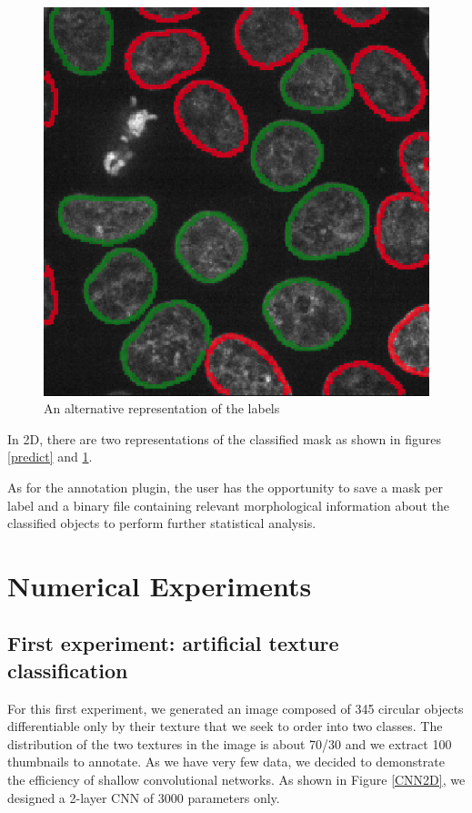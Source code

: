 \documentclass{article}
\begin{document}
\begin{figure}[h!]{}
 \centering
 \includegraphics[scale=0.15]{Figures/resultat_contour.png}
  \caption{An alternative representation of the labels}
  \label{predict_contours}

\end{figure}

In 2D, there are two representations of the classified mask as shown in figures \ref{predict} and \ref{predict_contours}.

As for the annotation plugin, the user has the opportunity to save a mask per label and a binary file containing relevant morphological information about the classified objects to perform further statistical analysis.


\section{Numerical Experiments}
\label{sec:experiments}


\subsection{First experiment: artificial texture classification}

For this first experiment, we generated an image composed of  345 circular objects differentiable only by their texture that we seek to order into two classes. The distribution of the two textures in the image is about 70/30 and we extract 100 thumbnails to annotate. 
As we have very few data, we decided to demonstrate the efficiency of shallow convolutional networks. As shown in Figure \ref{CNN2D}, we designed a 2-layer CNN of 3000 parameters only.
\end{document}
